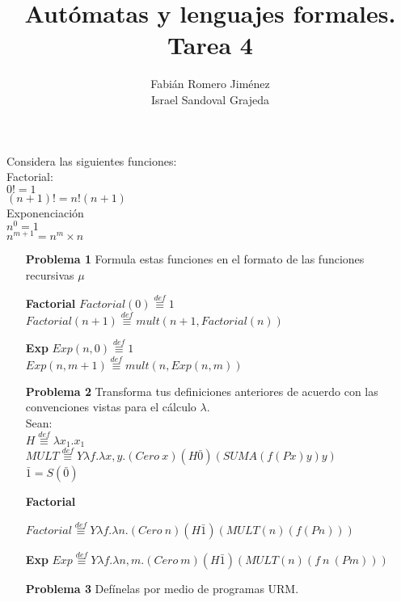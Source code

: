 \documentclass{article}
\title{Autómatas y lenguajes formales. Tarea 4}
\author{Fabián Romero Jiménez \\ Israel Sandoval Grajeda}
\begin{document}
\maketitle
Considera las siguientes funciones:\\
Factorial: \\
$0! = 1$ \\
$(n + 1)! = n!  (n + 1)$ \\
Exponenciación \\
$n^0=1$ \\
$n^{m+1}=n^m \times n$ \\

\begin{enumerate}
\item[\bf{Problema 1}] Formula estas funciones en el formato de las  
funciones recursivas $\mu$ 

\item[\bf{Factorial}]
$Factorial(0)  \stackrel{def}{\equiv} 1$\\
$Factorial(n+1) \stackrel{def}{\equiv} mult(n+1,Factorial(n))$

\item[\bf{Exp}]
$Exp(n,0)  \stackrel{def}{\equiv} 1$\\
$Exp(n,m+1) \stackrel{def}{\equiv} mult(n,Exp(n,m))$

\item[\bf{Problema 2}] Transforma tus definiciones anteriores de acuerdo con las convenciones vistas para el cálculo $\lambda$.\\
Sean: \\
$H \stackrel{def}{\equiv}  \lambda x_1.x_1$ \\
$MULT \stackrel{def}{\equiv} Y \lambda f . \lambda x,y . (Cero\:x)(H\bar0)(SUMA(f(P x)y)y)$\\$\bar1 = S(\bar0)$\\

\item[\bf{Factorial}]

$Factorial \stackrel{def}{\equiv}  Y \lambda f . \lambda n.(Cero \: n)(H\bar 1)(MULT(n)(f(P n))) $\\

\item[\bf{Exp}]$Exp \stackrel{def}{\equiv}  Y \lambda f . \lambda n,m.(Cero \: m)(H\bar 1) (MULT(n)(f\:n\:(P m) )) $\\

\item[\bf{Problema 3}] Defínelas por medio de programas URM.


\end{enumerate}
\end{document}
